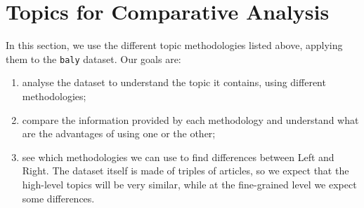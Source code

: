 




\section{\statusgreen Topics for Comparative Analysis}
\label{sec:topic_topic_granularities}

In this section, we use the different topic methodologies listed above, applying them to the \texttt{baly} dataset.
Our goals are:

\begin{enumerate}
    \item analyse the dataset to understand the topic it contains, using different methodologies;
    \item compare the information provided by each methodology and understand what are the advantages of using one or the other;
    \item see which methodologies we can use to find differences between Left and Right. The dataset itself is made of triples of articles, so we expect that the high-level topics will be very similar, while at the fine-grained level we expect some differences.
\end{enumerate}


